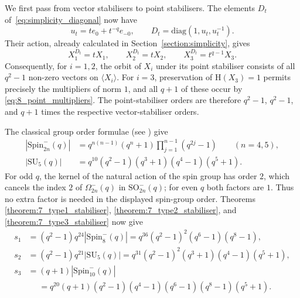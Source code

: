 \documentclass{amsart}
\newcommand{\diag}{\mathrm{diag}}
\newcommand{\SO}{\mathrm{SO}}
\newcommand{\SU}{\mathrm{SU}}
\newcommand{\Spin}{\mathrm{Spin}}
\renewcommand{\H}{\mathrm{H}}
\theoremstyle{plain}
\numberwithin{theorem}{section}
\theoremstyle{definition}
\begin{document}
We first pass from vector stabilisers to point stabilisers.  The elements
$D_t$ of~\eqref{eq:simplicity_diagonal} now have
\[
    u_t=t e_0+t^{-q}e_{-0},\qquad
    D_t=\diag(1,u_t,u_t^{-1}).
\]
Their action, already calculated in Section~\ref{section:simplicity}, gives
\begin{equation}
    \label{eq:8_point_multipliers}
    X_1^{D_t}=tX_1,\qquad
    X_2^{D_t}=tX_2,\qquad
    X_3^{D_t}=t^{q-1}X_3.
\end{equation}
Consequently, for $i=1,2$, the orbit of $X_i$ under its point stabiliser
consists of all $q^2-1$ non-zero vectors on $\langle X_i\rangle$.
For $i=3$, preservation of $\H(X_3)=1$ permits precisely the multipliers
of norm $1$, and all $q+1$ of these occur by
\eqref{eq:8_point_multipliers}.  The point-stabiliser orders are
therefore $q^2-1$, $q^2-1$, and $q+1$ times the respective
vector-stabiliser orders.

The classical group order formulae (see \cite[pp.~118, 165]{Taylor}) give
\begin{align*}
    |\Spin^-_{2n}(q)|
        &=q^{n(n-1)}(q^n+1)\prod_{j=1}^{n-1}(q^{2j}-1)
          \qquad(n=4,5),\\
    |\SU_5(q)|
        &=q^{10}(q^2-1)(q^3+1)(q^4-1)(q^5+1).
\end{align*}
For odd $q$, the kernel of the natural action of the spin group has
order $2$, which cancels the index $2$ of $\Omega^-_{2n}(q)$ in
$\SO^-_{2n}(q)$; for even $q$ both factors are $1$.  Thus no extra
factor is needed in the displayed spin-group order.  Theorems
\ref{theorem:7_type1_stabiliser}, \ref{theorem:7_type2_stabiliser}, and
\ref{theorem:7_type3_stabiliser} now give
\begin{equation}
    \label{eq:8_point_stabiliser_orders}
    \begin{aligned}
        s_1&=(q^2-1)q^{24}|\Spin^-_8(q)|
             =q^{36}(q^2-1)^2(q^6-1)(q^8-1),\\
        s_2&=(q^2-1)q^{21}|\SU_5(q)|
             =q^{31}(q^2-1)^2(q^3+1)(q^4-1)(q^5+1),\\
        s_3&=(q+1)|\Spin^-_{10}(q)|\\
             &\phantom{{}={}}=q^{20}(q+1)(q^2-1)(q^4-1)(q^6-1)(q^8-1)(q^5+1).
    \end{aligned}
\end{equation}
\end{document}
